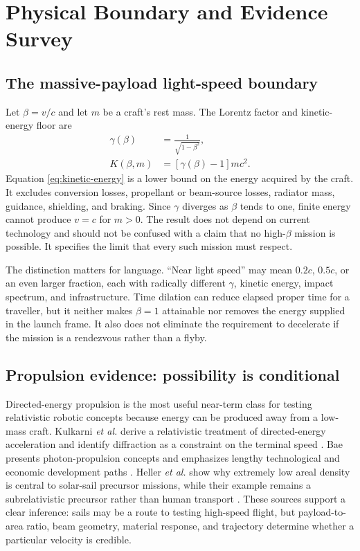 \documentclass[conference]{../../../../Conference-LaTeX-template_10-17-19/IEEEtran}
\begin{document}
\section{Physical Boundary and Evidence Survey}
\subsection{The massive-payload light-speed boundary}
Let $\beta=v/c$ and let $m$ be a craft's rest mass. The Lorentz factor and kinetic-energy floor are
\begin{align}
\gamma(\beta) &= \frac{1}{\sqrt{1-\beta^2}}, \label{eq:gamma}\\
K(\beta,m) &= \left[\gamma(\beta)-1\right]mc^2. \label{eq:kinetic-energy}
\end{align}
Equation \eqref{eq:kinetic-energy} is a lower bound on the energy acquired by the craft. It excludes conversion losses, propellant or beam-source losses, radiator mass, guidance, shielding, and braking. Since $\gamma$ diverges as $\beta$ tends to one, finite energy cannot produce $v=c$ for $m>0$. The result does not depend on current technology and should not be confused with a claim that no high-$\beta$ mission is possible. It specifies the limit that every such mission must respect.

The distinction matters for language. ``Near light speed'' may mean $0.2c$, $0.5c$, or an even larger fraction, each with radically different $\gamma$, kinetic energy, impact spectrum, and infrastructure. Time dilation can reduce elapsed proper time for a traveller, but it neither makes $\beta=1$ attainable nor removes the energy supplied in the launch frame. It also does not eliminate the requirement to decelerate if the mission is a rendezvous rather than a flyby.

\subsection{Propulsion evidence: possibility is conditional}
Directed-energy propulsion is the most useful near-term class for testing relativistic robotic concepts because energy can be produced away from a low-mass craft. Kulkarni \textit{et al.} derive a relativistic treatment of directed-energy acceleration and identify diffraction as a constraint on the terminal speed \cite{kulkarni2018}. Bae presents photon-propulsion concepts and emphasizes lengthy technological and economic development paths \cite{bae2012}. Heller \textit{et al.} show why extremely low areal density is central to solar-sail precursor missions, while their example remains a subrelativistic precursor rather than human transport \cite{heller2020}. These sources support a clear inference: sails may be a route to testing high-speed flight, but payload-to-area ratio, beam geometry, material response, and trajectory determine whether a particular velocity is credible.
\end{document}
